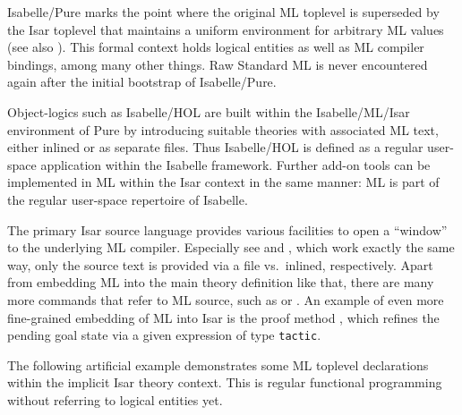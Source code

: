 \begin{isabellebody}
\begin{isamarkuptext}
  Isabelle/Pure marks the point where the original ML toplevel is
  superseded by the Isar toplevel that maintains a uniform environment
  for arbitrary ML values (see also ).  This
  formal context holds logical entities as well as ML compiler
  bindings, among many other things.  Raw Standard ML is never
  encountered again after the initial bootstrap of Isabelle/Pure.

  Object-logics such as Isabelle/HOL are built within the
  Isabelle/ML/Isar environment of Pure by introducing suitable
  theories with associated ML text, either inlined or as separate
  files.  Thus Isabelle/HOL is defined as a regular user-space
  application within the Isabelle framework.  Further add-on tools can
  be implemented in ML within the Isar context in the same manner: ML
  is part of the regular user-space repertoire of Isabelle.%
\end{isamarkuptext}%
\isamarkuptrue%
%
\isamarkuptrue%
%
\begin{isamarkuptext}%
The primary Isar source language provides various facilities
  to open a ``window'' to the underlying ML compiler.  Especially see
  \hyperlink{command.use}{\mbox{}} and \hyperlink{command.ML}{\mbox{}}, which work exactly the
  same way, only the source text is provided via a file vs.\ inlined,
  respectively.  Apart from embedding ML into the main theory
  definition like that, there are many more commands that refer to ML
  source, such as \hyperlink{command.setup}{\mbox{}} or \hyperlink{command.declaration}{\mbox{}}.
  An example of even more fine-grained embedding of ML into Isar is
  the proof method \hyperlink{method.tactic}{\mbox{}}, which refines the pending goal state
  via a given expression of type \verb|tactic|.%
\end{isamarkuptext}%
\isamarkuptrue%
%
\isadelimmlex
%
\endisadelimmlex
%
\isatagmlex
%
\begin{isamarkuptext}%
The following artificial example demonstrates some ML
  toplevel declarations within the implicit Isar theory context.  This
  is regular functional programming without referring to logical
  entities yet.%
\end{isamarkuptext}%
\isamarkuptrue%
%
\endisatagmlex
{\isafoldmlex}%
%
\isadelimmlex
%
\endisadelimmlex

\end{isabellebody}
